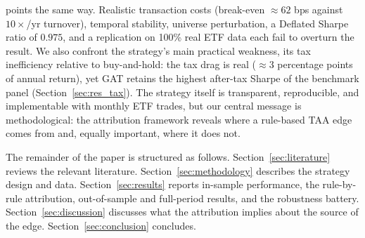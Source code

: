 points the same way. Realistic transaction costs (break-even
$\approx 62$ bps against $10\times$/yr turnover), temporal stability, universe
perturbation, a Deflated Sharpe ratio of $0.975$, and a replication on 100\% real
ETF data each fail to overturn the result. We also confront the strategy's main
practical weakness, its tax inefficiency relative to buy-and-hold: the tax drag is
real ($\approx 3$ percentage points of annual return), yet GAT retains the highest
after-tax Sharpe of the benchmark panel (Section~\ref{sec:res_tax}).
The strategy itself is transparent, reproducible, and implementable with monthly
ETF trades, but our central message is methodological: the attribution framework
reveals where a rule-based TAA edge comes from and, equally important, where it
does not.

The remainder of the paper is structured as follows.
Section~\ref{sec:literature} reviews the relevant literature.
Section~\ref{sec:methodology} describes the strategy design and data.
Section~\ref{sec:results} reports in-sample performance, the rule-by-rule
attribution, out-of-sample and full-period results, and the robustness battery.
Section~\ref{sec:discussion} discusses what the attribution implies about the
source of the edge.
Section~\ref{sec:conclusion} concludes.
